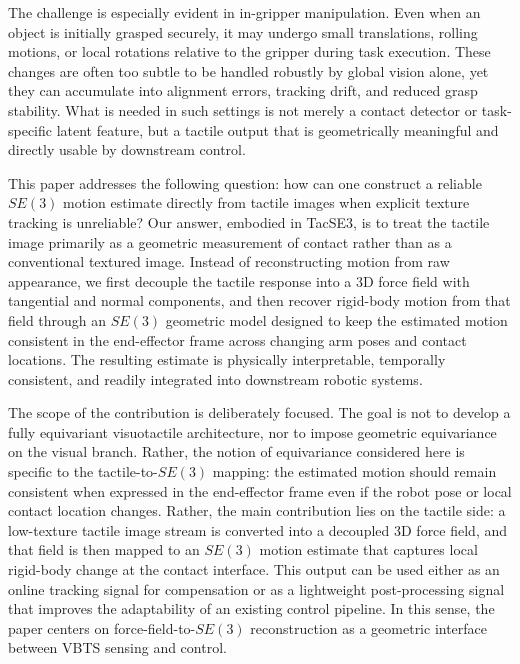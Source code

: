 \documentclass[letterpaper,10pt,journal,twoside]{IEEEtran}
\begin{document}
The challenge is especially evident in in-gripper manipulation. Even when an object is initially grasped securely, it may undergo small translations, rolling motions, or local rotations relative to the gripper during task execution. These changes are often too subtle to be handled robustly by global vision alone, yet they can accumulate into alignment errors, tracking drift, and reduced grasp stability. What is needed in such settings is not merely a contact detector or task-specific latent feature, but a tactile output that is geometrically meaningful and directly usable by downstream control.

This paper addresses the following question: how can one construct a reliable $SE(3)$ motion estimate directly from tactile images when explicit texture tracking is unreliable? Our answer, embodied in TacSE3, is to treat the tactile image primarily as a geometric measurement of contact rather than as a conventional textured image. Instead of reconstructing motion from raw appearance, we first decouple the tactile response into a 3D force field with tangential and normal components, and then recover rigid-body motion from that field through an $SE(3)$ geometric model designed to keep the estimated motion consistent in the end-effector frame across changing arm poses and contact locations. The resulting estimate is physically interpretable, temporally consistent, and readily integrated into downstream robotic systems.

The scope of the contribution is deliberately focused. The goal is not to develop a fully equivariant visuotactile architecture, nor to impose geometric equivariance on the visual branch. Rather, the notion of equivariance considered here is specific to the tactile-to-$SE(3)$ mapping: the estimated motion should remain consistent when expressed in the end-effector frame even if the robot pose or local contact location changes. Rather, the main contribution lies on the tactile side: a low-texture tactile image stream is converted into a decoupled 3D force field, and that field is then mapped to an $SE(3)$ motion estimate that captures local rigid-body change at the contact interface. This output can be used either as an online tracking signal for compensation or as a lightweight post-processing signal that improves the adaptability of an existing control pipeline. In this sense, the paper centers on force-field-to-$SE(3)$ reconstruction as a geometric interface between VBTS sensing and control.
\end{document}
